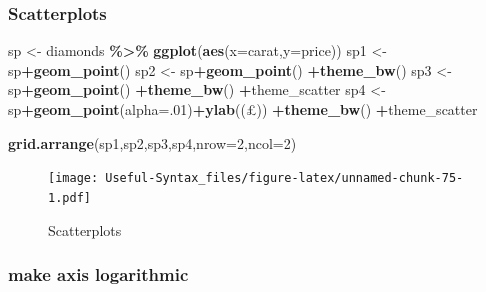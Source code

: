 \documentclass[
]{article}
\newenvironment{Shaded}{\begin{snugshade}}{\end{snugshade}}
\newcommand{\AttributeTok}[1]{\textcolor[rgb]{0.13,0.29,0.53}{#1}}
\newcommand{\DecValTok}[1]{\textcolor[rgb]{0.00,0.00,0.81}{#1}}
\newcommand{\FunctionTok}[1]{\textcolor[rgb]{0.13,0.29,0.53}{\textbf{#1}}}
\newcommand{\NormalTok}[1]{#1}
\newcommand{\OtherTok}[1]{\textcolor[rgb]{0.56,0.35,0.01}{#1}}
\newcommand{\SpecialCharTok}[1]{\textcolor[rgb]{0.81,0.36,0.00}{\textbf{#1}}}
\newcommand{\StringTok}[1]{\textcolor[rgb]{0.31,0.60,0.02}{#1}}
\begin{document}
\hypertarget{scatterplots}{%
\subsubsection{Scatterplots}\label{scatterplots}}

\begin{Shaded}
\begin{Highlighting}[]
\NormalTok{sp }\OtherTok{\textless{}{-}}\NormalTok{ diamonds }\SpecialCharTok{\%\textgreater{}\%} \FunctionTok{ggplot}\NormalTok{(}\FunctionTok{aes}\NormalTok{(}\AttributeTok{x=}\NormalTok{carat,}\AttributeTok{y=}\NormalTok{price))}
\NormalTok{sp1 }\OtherTok{\textless{}{-}}\NormalTok{ sp}\SpecialCharTok{+}\FunctionTok{geom\_point}\NormalTok{()}
\NormalTok{sp2 }\OtherTok{\textless{}{-}}\NormalTok{ sp}\SpecialCharTok{+}\FunctionTok{geom\_point}\NormalTok{() }\SpecialCharTok{+}\FunctionTok{theme\_bw}\NormalTok{()}
\NormalTok{sp3 }\OtherTok{\textless{}{-}}\NormalTok{ sp}\SpecialCharTok{+}\FunctionTok{geom\_point}\NormalTok{() }\SpecialCharTok{+}\FunctionTok{theme\_bw}\NormalTok{() }\SpecialCharTok{+}\NormalTok{theme\_scatter}
\NormalTok{sp4 }\OtherTok{\textless{}{-}}\NormalTok{ sp}\SpecialCharTok{+}\FunctionTok{geom\_point}\NormalTok{(}\AttributeTok{alpha=}\NormalTok{.}\DecValTok{01}\NormalTok{)}\SpecialCharTok{+}\FunctionTok{ylab}\NormalTok{(}\StringTok{\textquotesingle{}(£)\textquotesingle{}}\NormalTok{) }\SpecialCharTok{+}\FunctionTok{theme\_bw}\NormalTok{() }\SpecialCharTok{+}\NormalTok{theme\_scatter}


\FunctionTok{grid.arrange}\NormalTok{(sp1,sp2,sp3,sp4,}\AttributeTok{nrow=}\DecValTok{2}\NormalTok{,}\AttributeTok{ncol=}\DecValTok{2}\NormalTok{)}
\end{Highlighting}
\end{Shaded}

\begin{figure}
\centering
\texttt{[image: Useful-Syntax\_files/figure-latex/unnamed-chunk-75-1.pdf]}
\caption{\label{fig:unnamed-chunk-75}Scatterplots}
\end{figure}

\hypertarget{make-axis-logarithmic}{%
\subsubsection{make axis logarithmic}\label{make-axis-logarithmic}}
\end{document}
